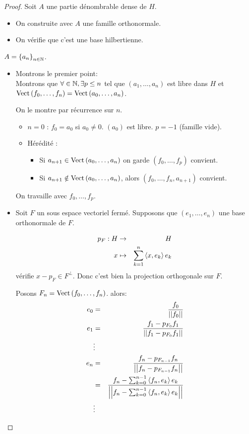 \begin{proof}
	Soit $A$ une partie dénombrable dense de $H$.

	\begin{itemize}
		\item On construite avec $A$ une famille orthonormale.
		\item On vérifie que c'est une base hilbertienne.
	\end{itemize}

	$A = \left\{ a_n \right\}_{n\in \mathbb{N}}$.

	\begin{itemize}
		\item Montrons le premier point:\\

		      Montrons que $\forall  \in \mathbb{N}, \exists p \leq n$ tel que $(a_1, \dots, a_n)$ est libre dans $H$ et $\text{Vect}\left( f_0, \dots, f_n \right) = \text{Vect}\left( a_0, \dots, a_n \right)$.

		      On le montre par récurrence sur $n$.

		      \begin{itemize}
			      \item $n=0$ : $f_0 = a_0$ si $a_0 \neq 0$. $(a_0)$ est libre. $p = -1$ (famille vide).
			      \item Hérédité :
			            \begin{itemize}
				            \item Si $a_{n+1} \in \text{Vect}\left( a_0, \dots , a_n \right)$ on garde $(f_0, \dots, f_p)$ convient.
				            \item Si $a_{n+1} \notin \text{Vect}\left( a_0, \dots , a_n \right)$, alors $(f_0, \dots, f_n, a_{n+1})$ convient.
			            \end{itemize}
		      \end{itemize}

		      On travaille avec $f_0, \dots, f_p$.
		\item Soit $F$ un sous espace vectoriel fermé. Supposons que $(e_1, \dots, e_n)$ une base orthonormale de $F$.

		      \begin{eqnarray*}
			      p_F: H & \to & H \\
			      x & \mapsto & \sum_{k=1}^n \left\langle x, e_k \right\rangle e_k
		      \end{eqnarray*}
		      vérifie $x - p_F \in F^{\perp}$. Donc c'est bien la projection orthogonale sur $F$.

		      Posons $F_n = \text{Vect}\left( f_0, \dots, f_n \right)$.
		      alors:
		      \begin{eqnarray*}
			      e_0 &=& \frac {f_0} {\left|\left|f_0\right|\right|} \\
			      e_1 &=& \frac {f_1 - p_{F_0} f_1} {\left|\left|f_1 - p_{F_0} f_1\right|\right|} \\
			      &\vdots& \\
			      e_n &=& \frac {f_n - p_{F_{n-1}} f_n} {\left|\left|f_n - p_{F_{n-1}} f_n\right|\right|}\\
			      &=& \frac {f_n - \sum_{k=0}^{n-1} \left\langle f_n, e_k \right\rangle e_k} {\left|\left|f_n - \sum_{k=0}^{n-1} \left\langle f_n, e_k \right\rangle e_k\right|\right|} \\
			      &\vdots&
		      \end{eqnarray*}


\end{itemize}
\end{proof}

